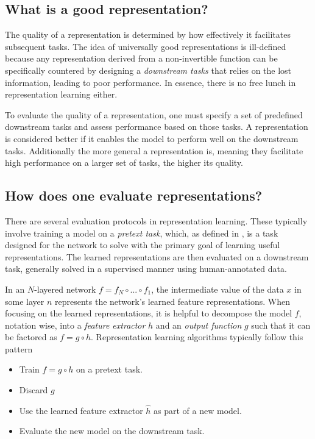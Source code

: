 \documentclass[../../thesis.tex]{subfiles}
\begin{document}
\subsection{What is a good representation?}

The quality of a representation is determined by how effectively it facilitates subsequent tasks. The idea of universally good representations is ill-defined because any representation derived from a non-invertible function can be specifically countered by designing a \textit{downstream tasks} that relies on the lost information, leading to poor performance. In essence, there is no free lunch in representation learning either.

To evaluate the quality of a representation, one must specify a set of predefined downstream tasks and assess performance based on those tasks. A representation is considered better if it enables the model to perform well on the downstream tasks. Additionally the more general a representation is, meaning they facilitate high performance on a larger set of tasks, the higher its quality.

\subsection{How does one evaluate representations?}
There are several evaluation protocols in representation learning. These typically involve training a model on a \textit{pretext task}, which, as defined in \cite{jing2019selfsupervised}, is a task designed for the network to solve with the primary goal of learning useful representations. The learned representations are then evaluated on a downstream task, generally solved in a supervised manner using human-annotated data.\newline

In an $N$-layered network $f = f_N\circ ...\circ f_1$, the intermediate value of the data $x$ in some layer $n$ represents the network's learned feature representations. When focusing on the learned representations, it is helpful to decompose the model $f$, notation wise, into a \textit{feature extractor} $h$ and an \textit{output function} $g$ such that it can be factored as $f = g \circ h$. Representation learning algorithms typically follow this pattern
\begin{itemize}
    \item Train $f= g \circ h$ on a pretext task.
    \item Discard $g$
    \item Use the learned feature extractor $\widehat{h}$ as part of a new model.
    \item Evaluate the new model on the downstream task. 
\end{itemize}
\end{document}
